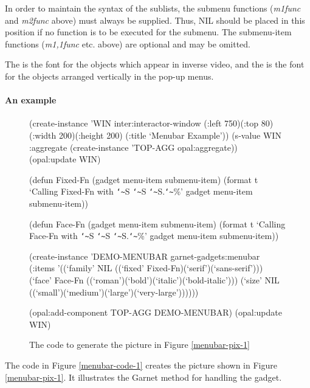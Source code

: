 In order to maintain the syntax of the sublists, the submenu functions
({\it m1func} and {\it m2func} above) must always be supplied.
Thus, NIL should be placed in this position if no function is
to be executed for the submenu.  The submenu-item functions ({\it m1,1func} etc.
above) are optional and may be omitted.

The  is the font for the  objects which appear
in inverse video, and the  is the font for the
 objects arranged vertically in the pop-up menus.


\begin{group}
\paragraph{An example}

\begin{figure}
\begin{programexample}

(create-instance 'WIN inter:interactor-window
   (:left 750)(:top 80)(:width 200)(:height 200)
   (:title `Menubar Example'))
(s-value WIN :aggregate (create-instance 'TOP-AGG opal:aggregate))
(opal:update WIN)

(defun Fixed-Fn (gadget menu-item submenu-item)
  (format t `Calling Fixed-Fn with {\tt\char`\~}S {\tt\char`\~}S {\tt\char`\~}S.{\tt\char`\~}\%' gadget menu-item submenu-item))

(defun Face-Fn (gadget menu-item submenu-item)
  (format t `Calling Face-Fn with {\tt\char`\~}S {\tt\char`\~}S {\tt\char`\~}S.{\tt\char`\~}\%' gadget menu-item submenu-item))

(create-instance 'DEMO-MENUBAR garnet-gadgets:menubar
   (:items
    '((`family' NIL
       ((`fixed' Fixed-Fn)(`serif')(`sans-serif')))
      (`face' Face-Fn
       ((`roman')(`bold')(`italic')(`bold-italic')))
      (`size' NIL
       ((`small')(`medium')(`large')(`very-large'))))))

(opal:add-component TOP-AGG DEMO-MENUBAR)
(opal:update WIN)

\end{programexample}
\caption{The code to generate the picture in Figure \ref{menubar-pix-1}}
\end{figure}

The code in Figure \ref{menubar-code-1} creates the  picture
shown in Figure \ref{menubar-pix-1}.  It illustrates the Garnet method for
handling the  gadget.
\end{group}

